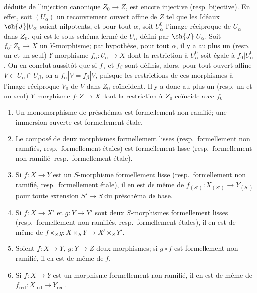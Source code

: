 \begin{remarks}[17.1.2]
\begin{enumerate}
  déduite de l'injection canonique $Z_0\to Z$, est encore injective (resp. bijective). En effet, soit $(U_\alpha)$ un recouvrement ouvert affine de $Z$ tel que les Idéaux $\sh{J}|U_\alpha$ soient nilpotents, et pour tout $\alpha$, soit $U^0_\alpha$ l'image réciproque de $U_\alpha$ dans $Z_0$, qui est le sous-schéma fermé de $U_\alpha$ défini par $\sh{J}|U_\alpha$. Soit $f_0:Z_0\to X$ un $Y$-morphisme; par hypothèse, pour tout $\alpha$, il y a au plus un (resp. un et un seul) $Y$-morphisme $f_\alpha:U_\alpha\to X$ dont la restriction à $U^0_\alpha$ soit égale à $f_0|U^0_\alpha$. On en conclut aussitôt que si $f_\alpha$ et $f_\beta$ sont définis, alors, pour tout ouvert affine $V\subset U_\alpha\cap U_\beta$, on a $f_\alpha|V=f_\beta|V$, puisque les restrictions de ces morphismes à l'image réciproque $V_0$ de $V$ dans $Z_0$ coïncident. Il y a donc au plus un (resp. un et un seul) $Y$-morphisme $f:Z\to X$ dont la restriction à $Z_0$ coïncide avec $f_0$.
\end{enumerate}
\end{remarks}

\begin{proposition}[17.1.3]
\label{IV.17.1.3}
\begin{enumerate}
  \item[\textup{(i)}] Un monomorphisme de préschémas est formellement non ramifié; une immersion ouverte est formellement étale.
  \item[\textup{(ii)}] Le composé de deux morphismes formellement lisses \textup{(resp.}\ formellement non ramifiés, \textup{resp.}\ formellement étales\textup{)} est formellement lisse \textup{(resp.}\ formellement non ramifié, \textup{resp.}\ formellement étale\textup{)}.
  \item[\textup{(iii)}] Si $f:X\to Y$ est un $S$-morphisme formellement lisse \textup{(resp.}\ formellement non ramifié, \textup{resp.}\ formellement étale\textup{)}, il en est de même de $f_{(S')}:X_{(S')}\to Y_{(S')}$ pour toute extension $S'\to S$ du préschéma de base.
  \item[\textup{(iv)}] Si $f:X\to X'$ et $g:Y\to Y'$ sont deux $S$-morphismes formellement lisses \textup{(resp.}\ formellement non ramifiés, \textup{resp.}\ formellement étales\textup{)}, il en est de même de $f\times_S g:X\times_S Y\to X'\times_S Y'$.
  \item[\textup{(v)}] Soient $f:X\to Y$, $g:Y\to Z$ deux morphismes; si $g\circ f$ est formellement non ramifié, il en est de même de $f$.
  \item[\textup{(vi)}] Si $f:X\to Y$ est un morphisme formellement non ramifié, il en est de même de $f_{\mathrm{red}}:X_{\mathrm{red}}\to Y_{\mathrm{red}}$.
\end{enumerate}
\end{proposition}

